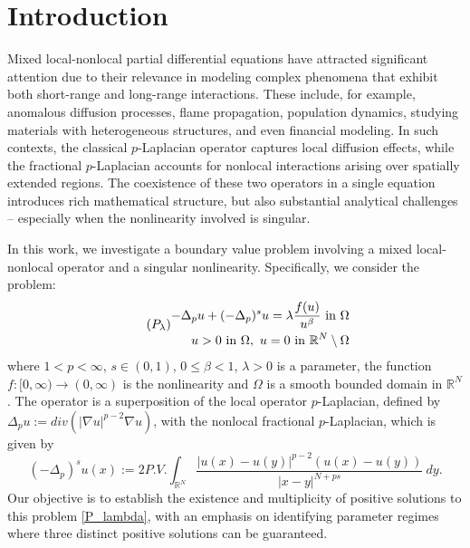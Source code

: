 \documentclass[reqno,oneside]{amsart}
\theoremstyle{definition}
\theoremstyle{remark}
\numberwithin{equation}{section}
\newcommand{\p}{\Delta_p}
\newcommand{\ps}{(-\Delta_p)^s}
\newcommand{\la} {\lambda}
\newcommand{\ba}{\beta}
\newcommand{\Om} {\Omega}
\newcommand{\sr}{\mathbb{R}}
\newcommand{\rar}{\rightarrow}
\newcommand{\na} {\nabla}
\newcommand{\bdry}{\mathbb{R}^N \setminus \Omega}
\begin{document}

\section{Introduction}

Mixed local-nonlocal partial differential equations have attracted significant attention due to their relevance in modeling complex phenomena that exhibit both short-range and long-range interactions. These include, for example, anomalous diffusion processes, flame propagation, population dynamics, studying materials with heterogeneous structures, and even financial modeling. In such contexts, the classical $p$-Laplacian operator captures local diffusion effects, while the fractional $p$-Laplacian accounts for nonlocal interactions arising over spatially extended regions. The coexistence of these two operators in a single equation introduces rich mathematical structure, but also substantial analytical challenges -- especially when the nonlinearity involved is singular.

In this work, we investigate a boundary value problem involving a mixed local-nonlocal operator and a singular nonlinearity. Specifically, we consider the problem: 
\begin{equation}\tag{$P_{\la}$}\label{P_lambda}
    \begin{aligned}
        -\p u + \ps u = \la \frac{f(u)}{u^{\ba}} \text{ in } \Om\\
        u >0 \text{ in } \Om,\ u =0 \text{ in } \bdry
    \end{aligned}
\end{equation}
where $1<p<\infty$, $s\in(0,1)$, $0\leq \ba<1$, $\la>0$ is a parameter, the function $f:[0,\infty) \rar (0,\infty)$ is the nonlinearity and $\Om$ is a smooth bounded domain in $\sr^N$. The operator is a superposition of the local operator $p$-Laplacian, defined by $\p u:= div \left(|\na u|^{p-2} \na u\right)$, with the nonlocal fractional $p$-Laplacian, which is given by $$\ps u(x):= 2 P.V. \int_{\sr^N} \frac{\left|u(x) - u(y)\right|^{p-2} \left(u(x) - u(y)\right)}{|x-y|^{N+ps}}\ dy.$$ 
Our objective is to establish the existence and multiplicity of positive solutions to this problem \eqref{P_lambda}, with an emphasis on identifying parameter regimes where three distinct positive solutions can be guaranteed.
\end{document}

